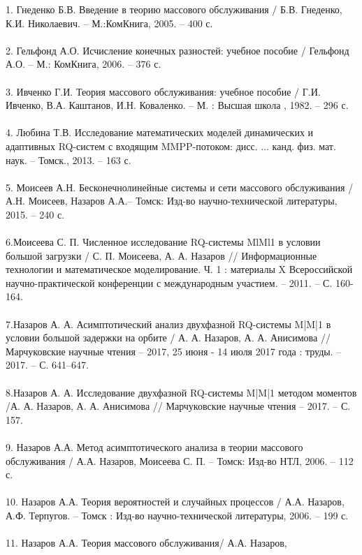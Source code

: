 1. Гнеденко Б.В.  Введение в теорию массового обслуживания / Б.В. Гнеденко, К.И. Николаевич. – М.:КомКнига, 2005. – 400 с.\\
\\
2. Гельфонд А.О. Исчисление конечных разностей: учебное пособие / Гельфонд А.О. -- М.: КомКнига, 2006. -- 376 с.\\
\\
3. Ивченко Г.И. Теория массового обслуживания: учебное пособие / Г.И. Ивченко, В.А. Каштанов, И.Н. Коваленко. -- 	
М. : Высшая школа , 1982. -- 296 с.\\
\\
4. Любина Т.В. Исследование математических моделей динамических и адаптивных RQ-систем с входящим MMPP-потоком: дисс. ... канд. физ. мат. наук. -- Томск., 2013. -- 163 с.\\
\\
5. Моисеев А.Н. Бесконечнолинейные системы и сети массового обслуживания / А.Н. Моисеев, Назаров А.А.-- Томск: Изд-во научно-технической литературы, 2015. -- 240 с.\\
\\
6.Моисеева С. П. Численное исследование RQ-системы MlMl1 в условии большой загрузки / С. П. Моисеева, А. А. Назаров // Информационные технологии и математическое моделирование. Ч. 1 : материалы X Всероссийской научно-практической конференции с международным участием. -- 2011. -- С. 160-164. \\
\\
7.Назаров А. А. Асимптотический анализ двухфазной RQ-системы M|M|1 в условии большой задержки на орбите / А. А. Назаров, А. А. Анисимова // Марчуковские научные чтения – 2017, 25 июня - 14 июля 2017 года : труды. -- 2017. -- С. 641--647.\\
\\
8.Назаров А. А. Исследование двухфазной RQ-системы M|M|1 методом моментов  /А. А. Назаров, А. А. Анисимова // Марчуковские научные чтения -- 2017. -- С. 157.\\
\\
9.  Назаров А.А. Метод асимптотического анализа в теории массового обслуживания / А.А. Назаров, Моисеева С. П. -- Томск: Изд-во НТЛ, 2006. -- 112 с.\\
\\
10. Назаров А.А. Теория вероятностей и случайных процессов / А.А. Назаров,
А.Ф. Терпугов. -- Томск : Изд-во научно-технической литературы, 2006. --
199 с. \\
\\
11. Назаров А.А. Теория массового обслуживания/ А.А. Назаров,
